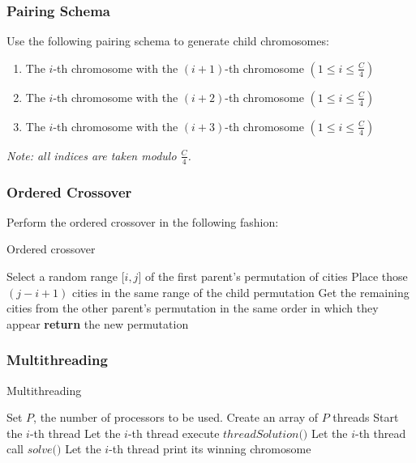 \documentclass[twoside,twocolumn]{article}
\begin{document}
  \subsubsection{Pairing Schema}
  
  Use the following pairing schema to generate child chromosomes:
  
  \begin{enumerate}
  \item The $i$-th chromosome with the $(i + 1)$-th chromosome $\left(1\leq i \leq \frac{C}{4}\right)$
  \item The $i$-th chromosome with the $(i + 2)$-th chromosome $\left(1\leq i \leq \frac{C}{4}\right)$
  \item The $i$-th chromosome with the $(i + 3)$-th chromosome $\left(1\leq i \leq \frac{C}{4}\right)$
  \end{enumerate} 
  
  \textit{Note: all indices are taken modulo $\frac{C}{4}$.}
  
  \subsubsection{Ordered Crossover}
  
  Perform the ordered crossover in the following fashion:
  
  \begin{algorithm}
          \caption{Ordered crossover}\label{oc}
          {\fontsize{6}{6}\selectfont \begin{algorithmic}[1]
              \State Select a random range $\big[i, j\big]$ of the first parent's permutation of cities
              \State Place those $(j - i + 1)$ cities in the same range of the child permutation
              \State Get the remaining cities from the other parent’s permutation in the same order in which they appear
              \State \textbf{return} the new permutation
              \EndProcedure
          \end{algorithmic}}
  \end{algorithm}
  
  \subsubsection{Multithreading}
  
  \begin{algorithm}
          \caption{Multithreading}\label{oc}
          {\fontsize{7}{7}\selectfont \begin{algorithmic}[1]
              \State Set $P$, the number of processors to be used.
              \State Create an array of $P$ threads
                \State Start the $i$-th thread
                \State Let the $i$-th thread execute $threadSolution\big(\big)$ 
                \State Let the $i$-th thread call $solve\big(\big)$
                \State Let the $i$-th thread print its winning chromosome
              \EndFor
              \EndProcedure
          \end{algorithmic}}
  \end{algorithm}
\end{document}
